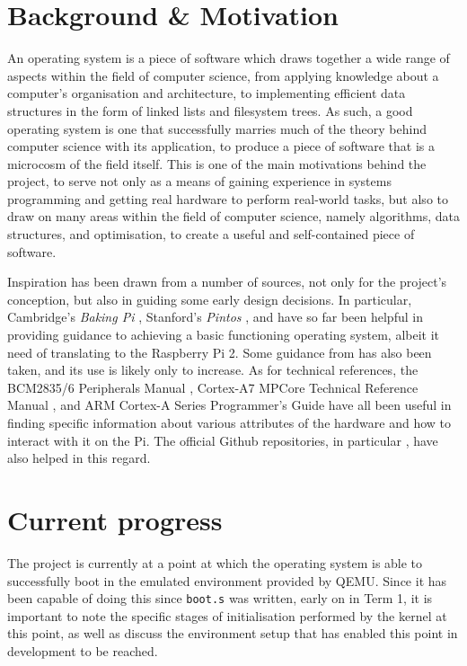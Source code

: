 \documentclass[10pt,a4paper]{article}
\newcommand{\code}[1]{\texttt{#1}}
\begin{document}
\section*{Background \& Motivation}
An operating system is a piece of software which draws together a wide range of
aspects within the field of computer science, from applying knowledge about a
computer's organisation and architecture, to implementing efficient data
structures in the form of linked lists and filesystem trees. As such, a good
operating system is one that successfully marries much of the theory behind
computer science with its application, to produce a piece of software that is a
microcosm of the field itself. This is one of the main motivations behind the
project, to serve not only as a means of gaining experience in systems
programming and getting real hardware to perform real-world tasks, but also to
draw on many areas within the field of computer science, namely algorithms, data
structures, and optimisation, to create a useful and self-contained piece of
software.

Inspiration has been drawn from a number of sources, not only for the project's
conception, but also in guiding some early design decisions. In particular,
Cambridge's \textit{Baking Pi} \cite{BakingPi}, Stanford's \textit{Pintos}
\cite{Pintos}, and \cite{jsandler} have so far been helpful in providing
guidance to achieving a basic functioning operating system, albeit it need of
translating to the Raspberry Pi 2. Some guidance from \cite{littleosbook} has
also been taken, and its use is likely only to increase. As for technical
references, the BCM2835/6 Peripherals Manual \cite{BCM2835, BCM2836}, Cortex-A7
MPCore Technical Reference Manual \cite{TRM}, and ARM Cortex-A Series
Programmer's Guide \cite{PG} have all been useful in finding specific
information about various attributes of the hardware and how to interact with it
on the Pi. The official Github repositories, in particular
\cite{PiDocumentation}, have also helped in this regard.

\section*{Current progress}
The project is currently at a point at which the operating system is able to
successfully boot in the emulated environment provided by QEMU. Since it has
been capable of doing this since \code{boot.s} was written, early on in Term 1,
it is important to note the specific stages of initialisation performed by the
kernel at this point, as well as discuss the environment setup that has enabled
this point in development to be reached.
\end{document}
